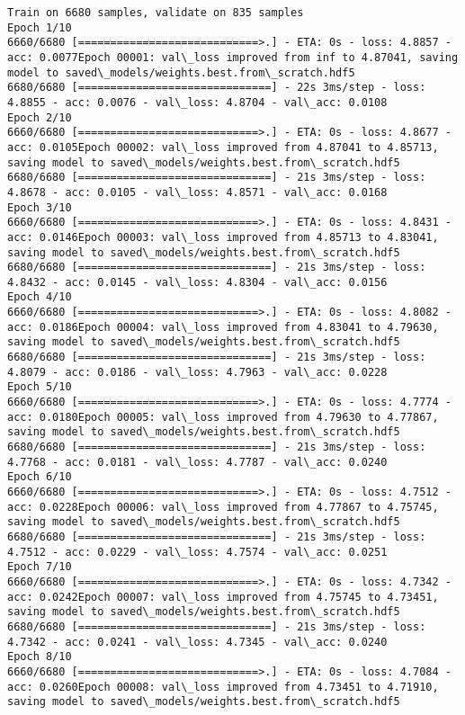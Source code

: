 \documentclass[11pt]{article}
\begin{document}
    \begin{Verbatim}[commandchars=\\\{\}]
Train on 6680 samples, validate on 835 samples
Epoch 1/10
6660/6680 [============================>.] - ETA: 0s - loss: 4.8857 - acc: 0.0077Epoch 00001: val\_loss improved from inf to 4.87041, saving model to saved\_models/weights.best.from\_scratch.hdf5
6680/6680 [==============================] - 22s 3ms/step - loss: 4.8855 - acc: 0.0076 - val\_loss: 4.8704 - val\_acc: 0.0108
Epoch 2/10
6660/6680 [============================>.] - ETA: 0s - loss: 4.8677 - acc: 0.0105Epoch 00002: val\_loss improved from 4.87041 to 4.85713, saving model to saved\_models/weights.best.from\_scratch.hdf5
6680/6680 [==============================] - 21s 3ms/step - loss: 4.8678 - acc: 0.0105 - val\_loss: 4.8571 - val\_acc: 0.0168
Epoch 3/10
6660/6680 [============================>.] - ETA: 0s - loss: 4.8431 - acc: 0.0146Epoch 00003: val\_loss improved from 4.85713 to 4.83041, saving model to saved\_models/weights.best.from\_scratch.hdf5
6680/6680 [==============================] - 21s 3ms/step - loss: 4.8432 - acc: 0.0145 - val\_loss: 4.8304 - val\_acc: 0.0156
Epoch 4/10
6660/6680 [============================>.] - ETA: 0s - loss: 4.8082 - acc: 0.0186Epoch 00004: val\_loss improved from 4.83041 to 4.79630, saving model to saved\_models/weights.best.from\_scratch.hdf5
6680/6680 [==============================] - 21s 3ms/step - loss: 4.8079 - acc: 0.0186 - val\_loss: 4.7963 - val\_acc: 0.0228
Epoch 5/10
6660/6680 [============================>.] - ETA: 0s - loss: 4.7774 - acc: 0.0180Epoch 00005: val\_loss improved from 4.79630 to 4.77867, saving model to saved\_models/weights.best.from\_scratch.hdf5
6680/6680 [==============================] - 21s 3ms/step - loss: 4.7768 - acc: 0.0181 - val\_loss: 4.7787 - val\_acc: 0.0240
Epoch 6/10
6660/6680 [============================>.] - ETA: 0s - loss: 4.7512 - acc: 0.0228Epoch 00006: val\_loss improved from 4.77867 to 4.75745, saving model to saved\_models/weights.best.from\_scratch.hdf5
6680/6680 [==============================] - 21s 3ms/step - loss: 4.7512 - acc: 0.0229 - val\_loss: 4.7574 - val\_acc: 0.0251
Epoch 7/10
6660/6680 [============================>.] - ETA: 0s - loss: 4.7342 - acc: 0.0242Epoch 00007: val\_loss improved from 4.75745 to 4.73451, saving model to saved\_models/weights.best.from\_scratch.hdf5
6680/6680 [==============================] - 21s 3ms/step - loss: 4.7342 - acc: 0.0241 - val\_loss: 4.7345 - val\_acc: 0.0240
Epoch 8/10
6660/6680 [============================>.] - ETA: 0s - loss: 4.7084 - acc: 0.0260Epoch 00008: val\_loss improved from 4.73451 to 4.71910, saving model to saved\_models/weights.best.from\_scratch.hdf5

\end{Verbatim}
\end{document}
